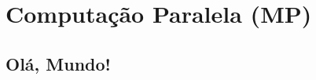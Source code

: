 
\chapter{Computação Paralela (MP)}\label{cap_mp}
\thispagestyle{fancy}

\section{Olá, Mundo!}\label{sec_ola_cap_mp}

\ifiscc

\fi

\emconstrucao